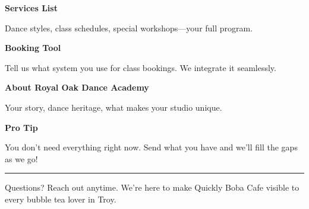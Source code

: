 \documentclass[11pt,letterpaper]{article}
\begin{document}
\hfill
\begin{minipage}[t]{0.48\textwidth}
\begin{tcolorbox}[colframe=accent-teal, boxrule=1pt, left=0.7em, right=0.7em, top=0.5em, bottom=0.5em, arc=4pt, boxsep=0pt]
{\bfseries\small\color{accent-teal}Services List}

\vspace{0.15em}

{\small Dance styles, class schedules, special workshops—your full program.}
\end{tcolorbox}

\vspace{0.1em}

\begin{tcolorbox}[colframe=accent-teal, boxrule=1pt, left=0.7em, right=0.7em, top=0.5em, bottom=0.5em, arc=4pt, boxsep=0pt]
{\bfseries\small\color{accent-teal}Booking Tool}

\vspace{0.15em}

{\small Tell us what system you use for class bookings. We integrate it seamlessly.}
\end{tcolorbox}

\vspace{0.1em}

\begin{tcolorbox}[colframe=accent-teal, boxrule=1pt, left=0.7em, right=0.7em, top=0.5em, bottom=0.5em, arc=4pt, boxsep=0pt]
{\bfseries\small\color{accent-teal}About Royal Oak Dance Academy}

\vspace{0.15em}

{\small Your story, dance heritage, what makes your studio unique.}
\end{tcolorbox}

\vspace{-0.2em}
\end{minipage}

\vspace{0.15em}

\begin{tcolorbox}[colback={accent-red!5}, colframe=accent-red!20, boxrule=0.5pt, left=0.7em, right=0.7em, top=0.4em, bottom=0.4em, arc=6pt, boxsep=0pt]

{\bfseries\small\color{accent-red}Pro Tip}

\vspace{0.1em}

{\small You don't need everything right now. Send what you have and we'll fill the gaps as we go!}

\end{tcolorbox}

\vspace{0.15em}

\noindent\hrule
\vspace{0.2em}

{\small\color{text-light}Questions? Reach out anytime. We're here to make Quickly Boba Cafe visible to every bubble tea lover in Troy.}
\end{document}
